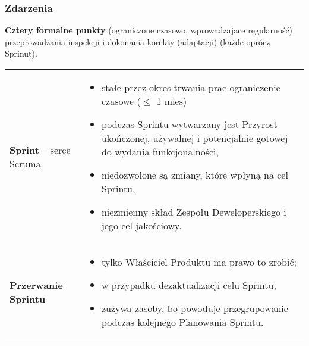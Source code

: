 \documentclass[a4paper]{article}
\begin{document}
    \subsubsection{Zdarzenia}
    \textbf{Cztery formalne punkty} (ograniczone czasowo, wprowadzajace regularność) przeprowadzania inspekcji i dokonania korekty (adaptacji) (każde oprócz Sprinut).


    \begin{table}[H]
        \begin{center}
            \begin{tabular}{ p{} p{} }
                \textbf{Sprint} – serce Scruma
                &
                \begin{itemize}
                    \item stałe przez okres trwania prac ograniczenie czasowe ($\leq$ 1 mies)
                    \item podczas Sprintu wytwarzany jest Przyrost ukończonej,
                    używalnej i potencjalnie gotowej do wydania funkcjonalności,
                    \item niedozwolone są zmiany, które wpłyną na cel Sprintu,
                    \item niezmienny skład Zespołu Deweloperskiego i jego cel jakościowy.
                \end{itemize}
                \\

                \cmidrule(r){1-1}\cmidrule(l){2-2}
                \textbf{Przerwanie Sprintu}
                &
                \begin{itemize}
                    \item tylko Właściciel Produktu ma prawo to zrobić;
                    \item w przypadku dezaktualizacji celu Sprintu,
                    \item zużywa zasoby, bo powoduje przegrupowanie podczas kolejnego Planowania
                    Sprintu.
                \end{itemize}
                \\


\end{tabular}
\end{center}
\end{table}
\end{document}
